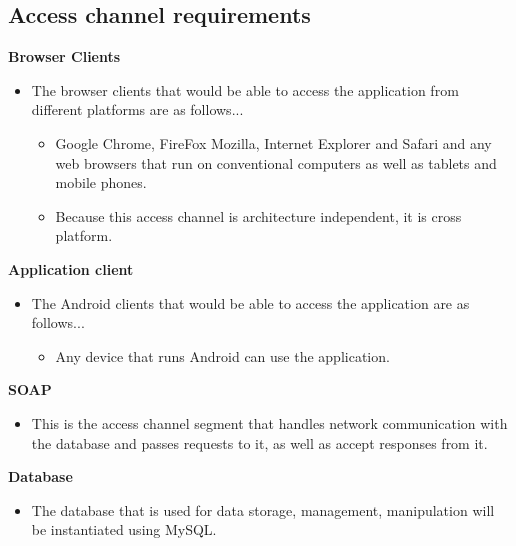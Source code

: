 \documentclass[10pt,a4paper]{article}
\begin{document}
\subsection{Access channel requirements}
\indent\indent \textbf{Browser Clients}
\begin{itemize}
\item The browser clients that would be able to access the application from different platforms are as follows...
\begin{itemize}
\item Google Chrome, FireFox Mozilla, Internet Explorer and Safari and any web browsers that run on conventional computers as well as tablets and mobile phones.
\item Because this access channel is architecture independent, it is cross platform.                                                               
\end{itemize}
\end{itemize}
\indent\indent \textbf{Application client}
\begin{itemize}
\item The Android clients that would be able to access the application are as follows...
\begin{itemize}
\item Any device that runs Android can use the application.
\end{itemize}
\end{itemize}                                
\indent\indent \textbf{SOAP}
\begin{itemize}
\item This is the access channel segment that handles network communication with the database and passes requests to it, as well as accept responses from it.
\end{itemize}                                                                
\indent\indent\textbf{Database}
\begin{itemize}
\item The database that is used for data storage, management, manipulation will be instantiated using MySQL.
\end{itemize}                                                                                                
\end{document}
